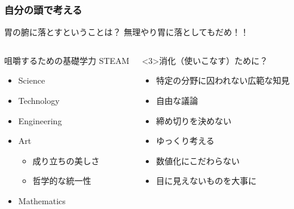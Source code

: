 \documentclass[12pt, dvipdfmx]{beamer}
\begin{document}
\begin{frame}
    \frametitle{自分の頭で考える}
        \begin{alertblock}{胃の腑に落とすということは？}
            無理やり胃に落としてもだめ！！

            \begin{columns}[T, onlytextwidth]
                
                \begin{block}{咀嚼するための基礎学力}
                    STEAM 
                    \begin{itemize}
                        \item Science
                        \item Technology
                        \item Engineering
                        \item \alert{Art}
                        \begin{itemize}
                            \item<2-> 成り立ちの美しさ
                            \item<2-> 哲学的な統一性 
                        \end{itemize}
                        \item Mathematics
                    \end{itemize}
                \end{block}
                \begin{exampleblock}<3>{消化（使いこなす）ために？}
                    \begin{itemize}
                        \item 特定の分野に囚われない広範な知見
                        \item 自由な議論
                        \item 締め切りを決めない
                        \item ゆっくり考える
                        \item 数値化にこだわらない
                        \item 目に見えないものを大事に
                    \end{itemize}
                \end{exampleblock}
            \end{columns}
        \end{alertblock}
        
\end{frame}
\end{document}
